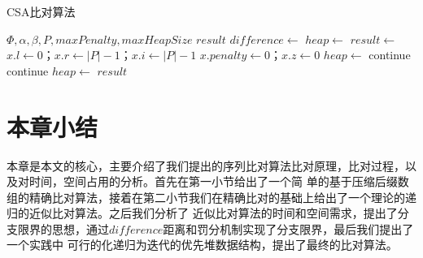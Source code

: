 \begin{algorithm}
    \caption{CSA比对算法}
    \label{alg:alignment}
    \begin{algorithmic}[1]
        \Require $\Phi,\alpha,\beta,P,maxPenalty,maxHeapSize$
        \Ensure $result$    
        \State $difference\gets$
        \State $heap \gets$ 
        \State $result \gets$
        \State $x.l\gets 0$；$x.r\gets |P|-1$；$x.i\gets |P|-1$
        \State $x.penalty\gets 0$；$x.z\gets 0$
        \State $heap\gets$     
                \State {}    
                \State continue
            \EndIf
              
                \State continue
            \EndIf
            \State $heap\gets$ 
             
                \State {}
            \EndWhile
        \EndWhile
        \State \Return $result$    
        \EndFunction
    \end{algorithmic}
\end{algorithm}

\section {本章小结}
本章是本文的核心，主要介绍了我们提出的序列比对算法比对原理，比对过程，以及对时间，空间占用的分析。首先在第一小节给出了一个简
单的基于压缩后缀数组的精确比对算法，接着在第二小节我们在精确比对的基础上给出了一个理论的递归的近似比对算法。之后我们分析了
近似比对算法的时间和空间需求，提出了分支限界的思想，通过$difference$距离和罚分机制实现了分支限界，最后我们提出了一个实践中
可行的化递归为迭代的优先堆数据结构，提出了最终的比对算法。
